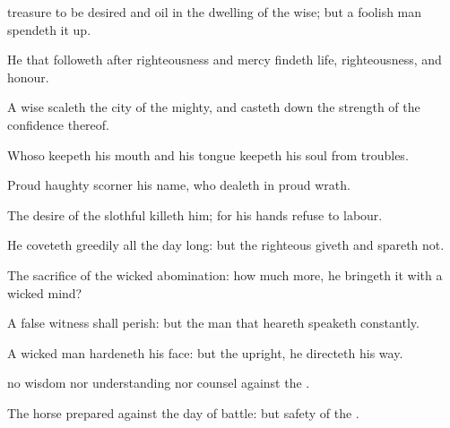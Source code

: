{
treasure to be
desired and
oil in the
dwelling of the
wise; but a
foolish
man spendeth it
up.

He that
followeth after
righteousness and
mercy
findeth
life,
righteousness, and
honour.

A
wise
{}
scaleth the
city of the
mighty, and casteth
down the
strength of the
confidence thereof.

Whoso
keepeth his
mouth and his
tongue
keepeth his
soul from
troubles.

Proud
{}
haughty
scorner
{} his
name, who
dealeth in
proud
wrath.


\par }{\PP {}The
desire of the
slothful
killeth him; for his
hands
refuse to
labour.

He
coveteth
greedily all the
day long: but the
righteous
giveth and
spareth not.

The
sacrifice of the
wicked
{}
abomination: how much more,
{} he
bringeth it with a wicked
mind?

A
false
witness shall
perish: but the
man that
heareth
speaketh
constantly.

A
wicked
man
hardeneth his
face: but
{} the
upright, he
directeth his
way.


\par }{\PP {} no
wisdom nor
understanding nor
counsel against the
{}.

The
horse
{}
prepared against the
day of
battle: but
safety
{} of the
{}.




\par }
